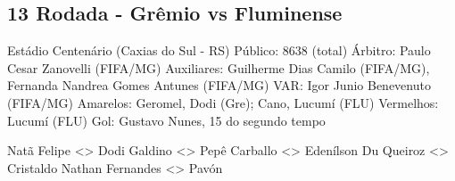 \newpage
\subsection{13 Rodada - Grêmio vs Fluminense}

\begin{figure}[H]
    \centering
    
\end{figure}


Estádio Centenário (Caxias do Sul - RS)
Público: 8638 (total)
Árbitro: Paulo Cesar Zanovelli (FIFA/MG)
Auxiliares: Guilherme Dias Camilo (FIFA/MG), Fernanda Nandrea Gomes Antunes (FIFA/MG)
VAR: Igor Junio Benevenuto (FIFA/MG)
Amarelos: Geromel, Dodi (Gre); Cano, Lucumí (FLU)
Vermelhos: Lucumí (FLU)
Gol: Gustavo Nunes, 15 do segundo tempo

Natã Felipe <> Dodi
Galdino <> Pepê
Carballo <> Edenílson
Du Queiroz <> Cristaldo
Nathan Fernandes <> Pavón